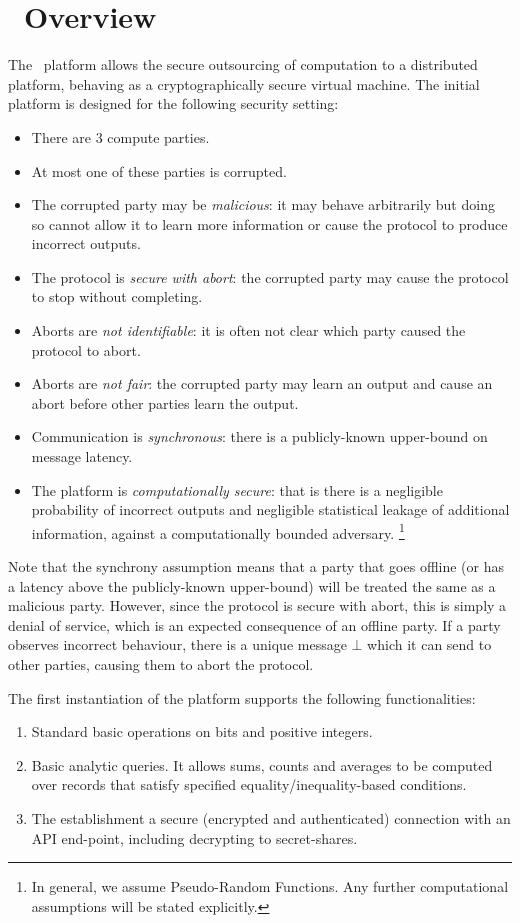 \section{\SLCompute~Overview}

The \SLCompute~platform allows the secure outsourcing of computation to a 
distributed platform, behaving as a cryptographically secure virtual machine.
The initial platform is designed for the following security setting:
\begin{itemize}
	\item There are 3 compute parties.
	\item At most one of these parties is corrupted.
	\item The corrupted party may be \emph{malicious}:
		it may behave arbitrarily but doing so cannot allow it to learn more
		information or cause the protocol to produce incorrect outputs.
	\item The protocol is \emph{secure with abort}: the corrupted party may cause the
		protocol to stop without completing.
	\item Aborts are \emph{not identifiable}: it is often not clear which party
		caused the protocol to abort.
	\item Aborts are \emph{not fair}: the corrupted party may learn an output and cause
		an abort before other parties learn the output.
	\item Communication is \emph{synchronous}: there is a publicly-known upper-bound
		on message latency. 
	\item The platform is \emph{computationally secure}:
		that is there is a negligible probability of incorrect outputs
		and negligible statistical leakage of additional information,
		against a computationally bounded adversary.%
		\footnote{
			In general, we assume Pseudo-Random Functions.
			Any further computational assumptions will be stated explicitly.
		}
\end{itemize}

Note that the synchrony assumption means that a party that goes offline
(or has a latency above the publicly-known upper-bound)
will be treated the same as a malicious party.
However, since the protocol is secure with abort,
this is simply a denial of service, which is an expected consequence of an offline party.
If a party observes incorrect behaviour, there is a unique message $\bot$
which it can send to other parties, causing them to abort the protocol.

The first instantiation of the platform supports the following functionalities:
\begin{enumerate}
	\item Standard basic operations on bits and positive integers.
	\item Basic analytic queries.
		It allows sums, counts and averages to be computed
		over records that satisfy specified equality/inequality-based conditions.
	\item The establishment a secure (encrypted and authenticated) 
		connection with an API end-point, including decrypting to secret-shares.
\end{enumerate}

